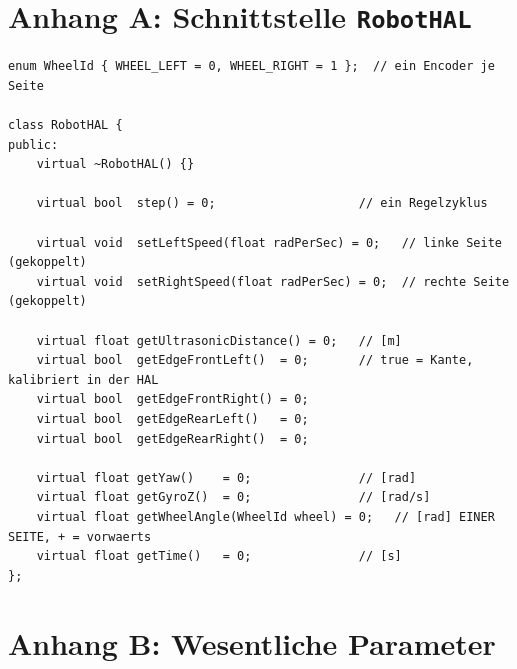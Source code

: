 \documentclass[
  a4paper,
  12pt,
  DIV=12,        %
  parskip=half,  %
  headings=small %
]{scrartcl}
\theoremstyle{definition}
\theoremstyle{definition}
\begin{document}
\section{Anhang A: Schnittstelle \texttt{RobotHAL}}\label{anhang-hal}

\begin{lstlisting}[style=cpp]
enum WheelId { WHEEL_LEFT = 0, WHEEL_RIGHT = 1 };  // ein Encoder je Seite

class RobotHAL {
public:
    virtual ~RobotHAL() {}

    virtual bool  step() = 0;                    // ein Regelzyklus

    virtual void  setLeftSpeed(float radPerSec) = 0;   // linke Seite (gekoppelt)
    virtual void  setRightSpeed(float radPerSec) = 0;  // rechte Seite (gekoppelt)

    virtual float getUltrasonicDistance() = 0;   // [m]
    virtual bool  getEdgeFrontLeft()  = 0;       // true = Kante, kalibriert in der HAL
    virtual bool  getEdgeFrontRight() = 0;
    virtual bool  getEdgeRearLeft()   = 0;
    virtual bool  getEdgeRearRight()  = 0;

    virtual float getYaw()    = 0;               // [rad]
    virtual float getGyroZ()  = 0;               // [rad/s]
    virtual float getWheelAngle(WheelId wheel) = 0;   // [rad] EINER SEITE, + = vorwaerts
    virtual float getTime()   = 0;               // [s]
};
\end{lstlisting}

\section{Anhang B: Wesentliche Parameter}\label{anhang-parameter}
\end{document}
